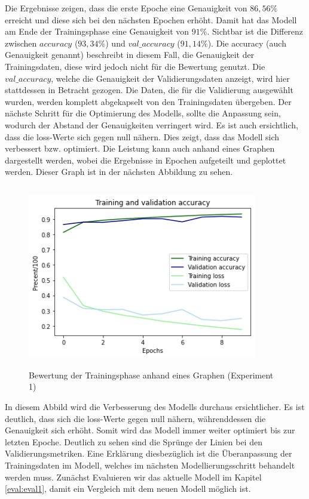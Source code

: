 \documentclass[12pt]{scrreprt}
\begin{document}
Die Ergebnisse zeigen, dass die erste Epoche eine Genauigkeit von $86,56\%$ erreicht und diese sich bei den nächsten Epochen erhöht. Damit hat das Modell am Ende der Trainingsphase eine Genauigkeit von $91\%$. Sichtbar ist die Differenz zwischen $accuracy$ ($93,34\%$) und $val\_accuracy$ ($91,14\%$). Die accuracy (auch Genauigkeit genannt) beschreibt in diesem Fall, die Genauigkeit der Trainingsdaten, diese wird jedoch nicht für die Bewertung genutzt. Die $val\_accuracy$, welche die Genauigkeit der Validierungsdaten anzeigt, wird hier stattdessen in Betracht gezogen. Die Daten, die für die Validierung ausgewählt wurden, werden komplett abgekapselt von den Trainingsdaten übergeben. Der nächste Schritt für die Optimierung des Modells, sollte die Anpassung sein, wodurch der Abstand der Genauigkeiten verringert wird. Es ist auch ersichtlich, dass die loss-Werte sich gegen null nähern. Dies zeigt, dass das Modell sich verbessert bzw. optimiert. Die Leistung kann auch anhand eines Graphen dargestellt werden, wobei die Ergebnisse in Epochen aufgeteilt und geplottet werden. Dieser Graph ist in der nächsten Abbildung zu sehen.\\
\begin{figure}[h!]
	\centering
	\includegraphics[width=10cm,height=8cm]		{ExperimentModelBewertungsgraf_1.png}
	\caption{ Bewertung der Trainingsphase anhand eines Graphen \cite{HK22}(Experiment 1)}
	\label{fig:fig15}
\end{figure}
	
In diesem Abbild wird die Verbesserung des Modells durchaus ersichtlicher. Es ist deutlich, dass sich die loss-Werte gegen null nähern, währenddessen die Genauigkeit sich erhöht. Somit wird das Modell immer weiter optimiert bis zur letzten Epoche. Deutlich zu sehen sind die Sprünge der Linien bei den Validierungsmetriken. Eine Erklärung diesbezüglich ist die Überanpassung der Trainingsdaten im Modell, welches im nächsten Modellierungsschritt behandelt werden muss. Zunächst Evaluieren wir das aktuelle Modell im Kapitel \ref{eval:eval1}, damit ein Vergleich mit dem neuen Modell möglich ist.
	
\end{document}
